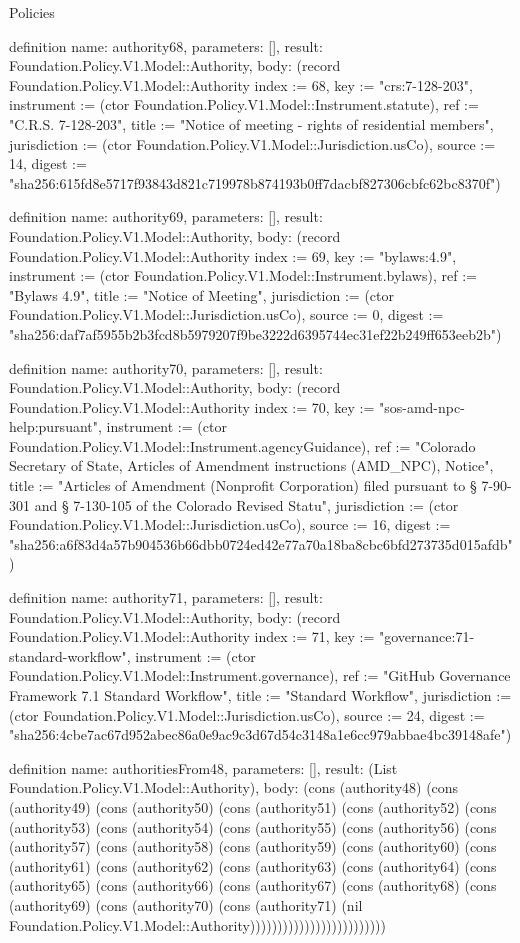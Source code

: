 \begin{lexlean}{Policies}
\begin{semanticmodule}
definition{
  name: authority68,
  parameters: [],
  result: Foundation.Policy.V1.Model::Authority,
  body: (record Foundation.Policy.V1.Model::Authority {index := 68, key := "crs:7-128-203", instrument := (ctor Foundation.Policy.V1.Model::Instrument.statute), ref := "C.R.S. 7-128-203", title := "Notice of meeting - rights of residential members", jurisdiction := (ctor Foundation.Policy.V1.Model::Jurisdiction.usCo), source := 14, digest := "sha256:615fd8e5717f93843d821c719978b874193b0ff7dacbf827306cbfc62bc8370f"})
}

definition{
  name: authority69,
  parameters: [],
  result: Foundation.Policy.V1.Model::Authority,
  body: (record Foundation.Policy.V1.Model::Authority {index := 69, key := "bylaws:4.9", instrument := (ctor Foundation.Policy.V1.Model::Instrument.bylaws), ref := "Bylaws 4.9", title := "Notice of Meeting", jurisdiction := (ctor Foundation.Policy.V1.Model::Jurisdiction.usCo), source := 0, digest := "sha256:daf7af5955b2b3fcd8b5979207f9be3222d6395744ec31ef22b249ff653eeb2b"})
}

definition{
  name: authority70,
  parameters: [],
  result: Foundation.Policy.V1.Model::Authority,
  body: (record Foundation.Policy.V1.Model::Authority {index := 70, key := "sos-amd-npc-help:pursuant", instrument := (ctor Foundation.Policy.V1.Model::Instrument.agencyGuidance), ref := "Colorado Secretary of State, Articles of Amendment instructions (AMD_NPC), Notice", title := "Articles of Amendment (Nonprofit Corporation) filed pursuant to § 7-90-301 and § 7-130-105 of the Colorado Revised Statu", jurisdiction := (ctor Foundation.Policy.V1.Model::Jurisdiction.usCo), source := 16, digest := "sha256:a6f83d4a57b904536b66dbb0724ed42e77a70a18ba8cbc6bfd273735d015afdb"})
}

definition{
  name: authority71,
  parameters: [],
  result: Foundation.Policy.V1.Model::Authority,
  body: (record Foundation.Policy.V1.Model::Authority {index := 71, key := "governance:71-standard-workflow", instrument := (ctor Foundation.Policy.V1.Model::Instrument.governance), ref := "GitHub Governance Framework 7.1 Standard Workflow", title := "Standard Workflow", jurisdiction := (ctor Foundation.Policy.V1.Model::Jurisdiction.usCo), source := 24, digest := "sha256:4cbe7ac67d952abec86a0e9ac9c3d67d54c3148a1e6cc979abbae4bc39148afe"})
}

definition{
  name: authoritiesFrom48,
  parameters: [],
  result: (List Foundation.Policy.V1.Model::Authority),
  body: (cons (authority48) (cons (authority49) (cons (authority50) (cons (authority51) (cons (authority52) (cons (authority53) (cons (authority54) (cons (authority55) (cons (authority56) (cons (authority57) (cons (authority58) (cons (authority59) (cons (authority60) (cons (authority61) (cons (authority62) (cons (authority63) (cons (authority64) (cons (authority65) (cons (authority66) (cons (authority67) (cons (authority68) (cons (authority69) (cons (authority70) (cons (authority71) (nil Foundation.Policy.V1.Model::Authority)))))))))))))))))))))))))
}


\end{semanticmodule}
\end{lexlean}

